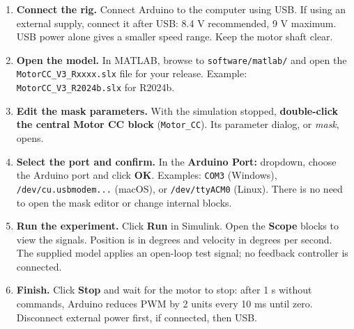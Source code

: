 \documentclass[11pt,a4paper]{article}
\begin{document}
\begin{center}\vspace{-3pt}
\vspace{-3pt}\end{center}

\begin{enumerate}
\item \textbf{Connect the rig.} Connect Arduino to the computer using USB. If using an external supply, connect it after USB: 8.4 V recommended, 9 V maximum. USB power alone gives a smaller speed range. Keep the motor shaft clear.
\item \textbf{Open the model.} In MATLAB, browse to \texttt{software/matlab/} and open the \texttt{MotorCC\_V3\_Rxxxx.slx} file for your release. Example: \texttt{MotorCC\_V3\_R2024b.slx} for R2024b.
\item \textbf{Edit the mask parameters.} With the simulation stopped, \textbf{double-click the central Motor CC block} (\texttt{Motor\_CC}). Its parameter dialog, or \emph{mask}, opens.
\item \textbf{Select the port and confirm.} In the \textbf{Arduino Port:} dropdown, choose the Arduino port and click \textbf{OK}. Examples: \texttt{COM3} (Windows), \texttt{/dev/cu.usbmodem...} (macOS), or \texttt{/dev/ttyACM0} (Linux). There is no need to open the mask editor or change internal blocks.
\item \textbf{Run the experiment.} Click \textbf{Run} in Simulink. Open the \textbf{Scope} blocks to view the signals. Position is in degrees and velocity in degrees per second. The supplied model applies an open-loop test signal; no feedback controller is connected.
\item \textbf{Finish.} Click \textbf{Stop} and wait for the motor to stop: after 1 s without commands, Arduino reduces PWM by 2 units every 10 ms until zero. Disconnect external power first, if connected, then USB.
\end{enumerate}
\end{document}
